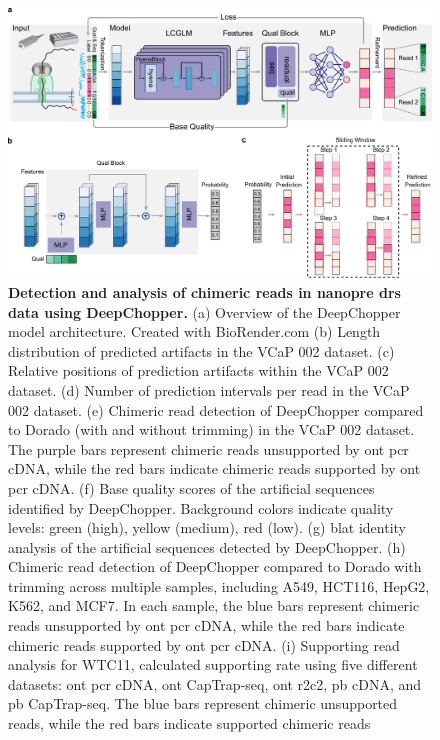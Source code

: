\documentclass[pdflatex, sn-mathphys-num, lineno]{sn-jnl}%
\theoremstyle{thmstyleone}%
\theoremstyle{thmstyletwo}%
\theoremstyle{thmstylethree}%
\begin{document}
\begin{figure}[!h]
    \includegraphics[height=0.78\columnwidth]{figures/finals/figure1}
    \caption{{\bf  Detection and analysis of chimeric reads in nanopre \gls{drs} data using DeepChopper.} (a) Overview of the DeepChopper model architecture. Created with BioRender.com (b) Length distribution of predicted artifacts in the VCaP 002 dataset. (c)  Relative positions of prediction artifacts within the VCaP 002 dataset. (d) Number of prediction intervals per read in the VCaP 002 dataset. (e) Chimeric read detection of DeepChopper compared to Dorado (with and without trimming) in the VCaP 002 dataset. The purple bars represent chimeric reads unsupported by \gls{ont} \gls{pcr} cDNA, while the red bars indicate chimeric reads supported by \gls{ont} \gls{pcr} cDNA.  (f) Base quality scores of the artificial sequences identified by DeepChopper. Background colors indicate quality levels: green (high), yellow (medium), red (low). (g) \gls{blat} identity analysis of the artificial sequences detected by DeepChopper. (h) Chimeric read detection of DeepChopper compared to Dorado with trimming across multiple samples, including A549, HCT116, HepG2, K562, and MCF7. In each sample, the blue bars represent chimeric reads unsupported by \gls{ont} \gls{pcr} cDNA, while the red bars indicate chimeric reads supported by \gls{ont} \gls{pcr} cDNA. (i)  Supporting read analysis for WTC11, calculated supporting rate using five different datasets: \gls{ont} \gls{pcr} cDNA, \gls{ont} CapTrap-seq, \gls{ont} \gls{r2c2}, \gls{pb} cDNA, and \gls{pb} CapTrap-seq. The blue bars represent chimeric unsupported reads, while the red bars indicate supported chimeric reads}\label{fig:f1}
\end{figure}
\end{document}

